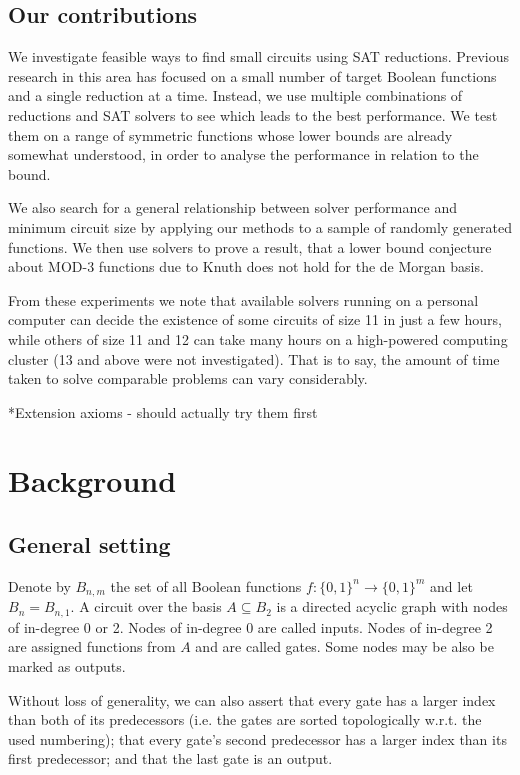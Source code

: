 \documentclass{article}
\begin{document}
\subsection{Our contributions}

We investigate feasible ways to find small circuits using SAT reductions. Previous research in this area has focused on a small number of target Boolean functions and a single reduction at a time. Instead, we use multiple combinations of reductions and SAT solvers to see which leads to the best performance. We test them on a range of symmetric functions whose lower bounds are already somewhat understood, in order to analyse the performance in relation to the bound. 

We also search for a general relationship between solver performance and minimum circuit size by applying our methods to a sample of randomly generated functions. We then use solvers to prove a result, that a lower bound conjecture about MOD-3 functions due to Knuth\cite{knuth15} does not hold for the de Morgan basis. 

From these experiments we note that available solvers running on a personal computer can decide the existence of some circuits of size 11 in just a few hours, while others of size 11 and 12 can take many hours on a high-powered computing cluster (13 and above were not investigated). That is to say, the amount of time taken to solve comparable problems can vary considerably.

*Extension axioms - should actually try them first


\section{Background}

\subsection{General setting}

Denote by \(B_{n,m}\) the set of all Boolean functions \(f: \{0,1\}^n \to \{0,1\}^m\) and let \(B_n = B_{n,1}\). A circuit over the basis \(A \subseteq B_2\) is a directed acyclic graph with nodes of in-degree 0 or 2. Nodes of in-degree 0 are called inputs. Nodes of in-degree 2 are assigned functions from \(A\) and are called gates. Some nodes may be also be marked as outputs.

Without loss of generality, we can also assert that every gate has a larger index than both of its predecessors (i.e. the gates are sorted topologically w.r.t. the used numbering); that every gate's second predecessor has a larger index than its first predecessor; and that the last gate is an output.~\cite{kulikov}
\end{document}
